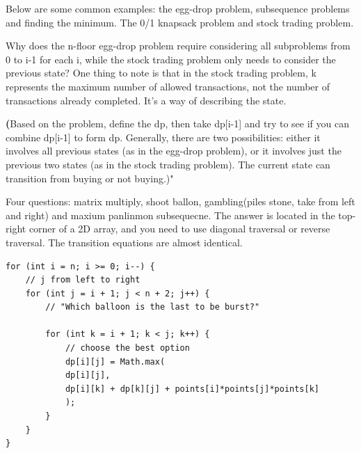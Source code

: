 \documentclass[a4paper,11pt,twoside]{book}
\begin{document}
	\par Below are some common examples: the egg-drop problem, subsequence problems and finding the minimum. The 0/1 knapsack problem and stock trading problem.
	
	\par Why does the n-floor egg-drop problem require considering all subproblems from 0 to i-1 for each i, while the stock trading problem only needs to consider the previous state?  One thing to note is that in the stock trading problem, k represents the maximum number of allowed transactions, not the number of transactions already completed. It’s a way of describing the state.
	
	\par \textbf(Based on the problem, define the dp, then take dp[i-1] and try to see if you can combine dp[i-1] to form dp. Generally, there are two possibilities: either it involves all previous states (as in the egg-drop problem), or it involves just the previous two states (as in the stock trading problem). The current state can transition from buying or not buying.)"
	
	
	\par Four questions: matrix multiply, shoot ballon, gambling(piles stone, take from left and right) and maxium panlinmon subsequecne. The answer is located in the top-right corner of a 2D array, and you need to use diagonal traversal or reverse traversal. The transition equations are almost identical.
	
\begin{lstlisting}
for (int i = n; i >= 0; i--) {
	// j from left to right
	for (int j = i + 1; j < n + 2; j++) {
		// "Which balloon is the last to be burst?"
		
		for (int k = i + 1; k < j; k++) {
			// choose the best option
			dp[i][j] = Math.max(
			dp[i][j], 
			dp[i][k] + dp[k][j] + points[i]*points[j]*points[k]
			);
		}
	}
}	
\end{lstlisting}	
	
\end{document}
